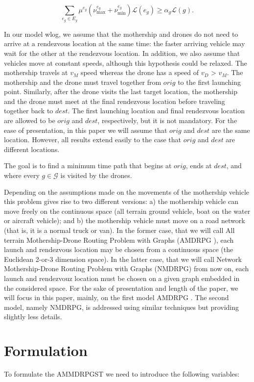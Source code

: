 \documentclass[10pt,a4paper]{article}
\def\AMD{{\sf AMDRPG \xspace }}
\def\NMD{{\sf NMDRPG\xspace}}
\newcommand{\JP}[1]{{\color{armygreen}#1}}
\newcommand{\LA}[1]{{\color{blue}#1}}
\begin{document}
\begin{equation}\label{eq:alpha-G}\tag{$\alpha$-G}
\sum_{e_g\in E_g} \mu^{e_g}(\nu_\text{max}^{e_g} + \nu_\text{min}^{e_g})\mathcal L(e_g)\geq \alpha_g\mathcal L(g).
\end{equation}

\JP{In our model wlog, we assume  that the mothership and drones do not need to arrive at a rendezvous location at the same time: the faster arriving vehicle may wait for the other at the rendezvous location. In addition, we also assume that vehicles move at constant speeds, although this hypothesis could be relaxed. The mothership travels at $v_M$ speed whereas the drone has a speed of $v_D$ > $v_M$. The mothership and the drone must travel together from $orig$ to the first launching point. Similarly, after the drone visits the last target location, the mothership and the drone must meet at the final rendezvous location before traveling together back to $dest$. The first launching location and final rendezvous location are allowed to be $orig$ and $dest$, respectively, but it is not mandatory. For the ease of presentation, in this paper we will assume that $orig$ and $dest$ are the same location. However, all results extend easily to the case that $orig$ and $dest$ are different locations.

The goal is to find a minimum time path that begins at $orig$, ends at $dest$, and where every $g \in \mathcal G$ is visited by the drones.

Depending on the assumptions made on the movements of the mothership vehicle this problem gives rise to two different versions: a) the mothership vehicle can move freely on the continuous space (all terrain ground vehicle, boat on the water or aircraft vehicle); and b) the mothership vehicle must move on a \LA{road} network (that is, it is a normal truck or van). In the former case, that we will call All terrain Mothership-Drone Routing Problem with Graphs (\AMD), each launch and rendezvous location may be chosen from a continuous space (the Euclidean 2-or-3 dimension space). In the latter case, that we will call Network Mothership-Drone Routing Problem with Graphs (\NMD) from now on, each launch and rendezvouz location must be chosen on a given graph embedded in the considered space. For the sake of presentation and length  of the paper, we will focus in this paper, mainly, on the first model \AMD. The second model, namely \NMD, is addressed using similar techniques but providing slightly less details.}

\section{Formulation}
To formulate the AMMDRPGST we need to introduce the following variables:
\end{document}
